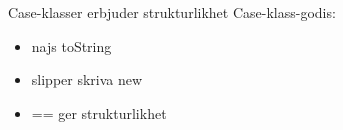 

\ifkompendium\else

\begin{Slide}{Case-klasser erbjuder strukturlikhet}
Case-klass-godis:
\begin{itemize}\SlideFontSmall
\item najs toString
\item slipper skriva new
\item == ger strukturlikhet
\end{itemize}
\end{Slide}

\fi

